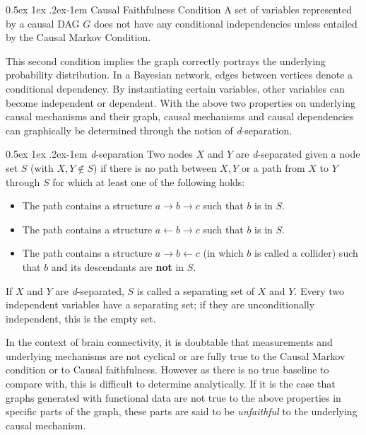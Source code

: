 \documentclass[a4paper, 10pt, english, onecolumn]{article}
\makeatletter
\renewcommand{\paragraph}{%
  \@startsection{paragraph}{4}%
  {\z@}{0.5ex \@plus 1ex \@minus .2ex}{-1em}%
  {\normalfont\normalsize\bfseries}%
}
\makeatother
\begin{document}
\paragraph{Causal Faithfulness Condition}
A set of variables represented by a causal DAG $G$ does not have any conditional independencies unless entailed by the Causal Markov Condition.

This second condition implies the graph correctly portrays the underlying probability distribution.
In a Bayesian network, edges between vertices denote a conditional dependency.
By instantiating certain variables, other variables can become independent or dependent.
With the above two properties on underlying causal mechanisms and their graph, causal mechanisms and causal dependencies can graphically be determined through the notion of \textit{d}-separation.

\paragraph{\textit{d}-separation}
Two nodes $X$ and $Y$ are \textit{d}-separated given a node set $S$ (with $X, Y \notin S$) if there is no path between $X,Y$ or a path from $X$ to $Y$ through $S$ for which at least one of the following holds:
\begin{itemize}
\item The path contains a structure $a \rightarrow b \rightarrow c$ such that $b$ is in $S$.
\item The path contains a structure $a \leftarrow b \rightarrow c$ such that $b$ is in $S$.
\item The path contains a structure $a \rightarrow b \leftarrow c$ (in which $b$ is called a collider) such that $b$ and its descendants are \textbf{not} in $S$.
\end{itemize}
If $X$ and $Y$ are \textit{d}-separated, $S$ is called a separating set of $X$ and $Y$.
Every two independent variables have a separating set; if they are unconditionally independent, this is the empty set.

In the context of brain connectivity, it is doubtable that measurements and underlying mechanisms are not cyclical or are fully true to the Causal Markov condition or to Causal faithfulness.
However as there is no true baseline to compare with, this is difficult to determine analytically.
If it is the case that graphs generated with functional data are not true to the above properties in specific parts of the graph, these parts are said to be \textit{unfaithful} to the underlying causal mechanism.
\end{document}
